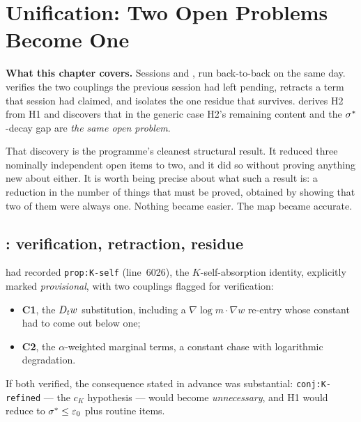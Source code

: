 \chapter{Unification: Two Open Problems Become One}
\label{ch:unification}

\begin{record}
\textbf{What this chapter covers.} Sessions  and , run
back-to-back on the same day.  verifies the two couplings the previous
session had left pending, retracts a term that session had claimed, and
isolates the one residue that survives.  derives H2 from H1 and
discovers that in the generic case H2's remaining content and the
\(\sigma^{*}\)-decay gap are \emph{the same open problem}.

\smallskip
That discovery is the programme's cleanest structural result. It reduced three
nominally independent open items to two, and it did so without proving
anything new about either. It is worth being precise about what such a result
is: a reduction in the number of things that must be proved, obtained by
showing that two of them were always one. Nothing became easier. The map
became accurate.
\end{record}

\section{\texorpdfstring{: verification, retraction, residue}{S36: verification, retraction, residue}}
\label{sec:s36}

 had recorded \texttt{prop:K-self} (line~6026), the
\(K\)-self-absorption identity, explicitly marked \emph{provisional}, with two
couplings flagged for verification:

\begin{itemize}[leftmargin=1.6em]
\item \textbf{C1}, the \(D_t w\) substitution, including a
  \(\nabla\log m\cdot\nabla w\) re-entry whose constant had to come out below
  one;
\item \textbf{C2}, the \(\alpha\)-weighted marginal terms, a constant chase
  with logarithmic degradation.
\end{itemize}

If both verified, the consequence stated in advance was substantial:
\texttt{conj:K-refined} --- the \(c_K\) hypothesis --- would become
\emph{unnecessary}, and H1 would reduce to \(\sigma^{*}\le\varepsilon_0\) plus
routine items.

